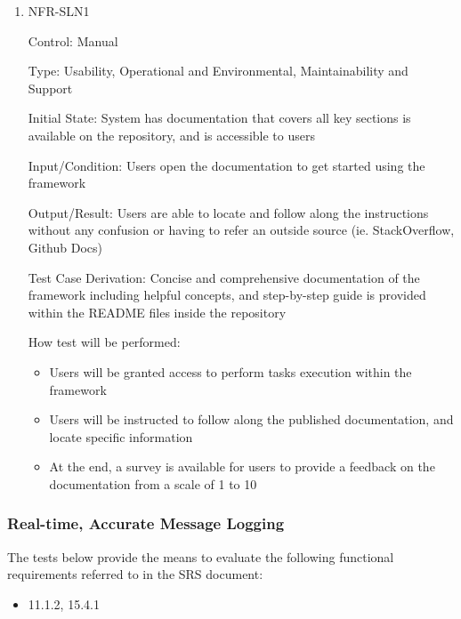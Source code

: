 \documentclass[12pt, titlepage]{article}
\begin{document}
\begin{enumerate}

\item{NFR-SLN1}

Control: Manual

Type: Usability, Operational and Environmental, Maintainability and Support
					
Initial State: System has documentation that covers all key sections is available on the repository, and is accessible to users
					
Input/Condition: Users open the documentation to get started using the framework
					
Output/Result: Users are able to locate and follow along the instructions without any confusion or having to refer an outside source (ie. StackOverflow, Github Docs)

Test Case Derivation: Concise and comprehensive documentation of the framework including helpful concepts, and step-by-step guide is provided within the README files inside the repository

How test will be performed:
  \begin{itemize}
    \item Users will be granted access to perform tasks execution within the framework
    \item Users will be instructed to follow along the published documentation, and locate specific information
    \item At the end, a survey is available for users to provide a feedback on the documentation from a scale of 1 to 10
  \end{itemize}

\end{enumerate}

\subsubsection{Real-time, Accurate Message Logging}

The tests below provide the means to evaluate the following functional requirements referred to in the SRS document:
\begin{itemize}
  \item 11.1.2, 15.4.1
\end{itemize}
\end{document}
